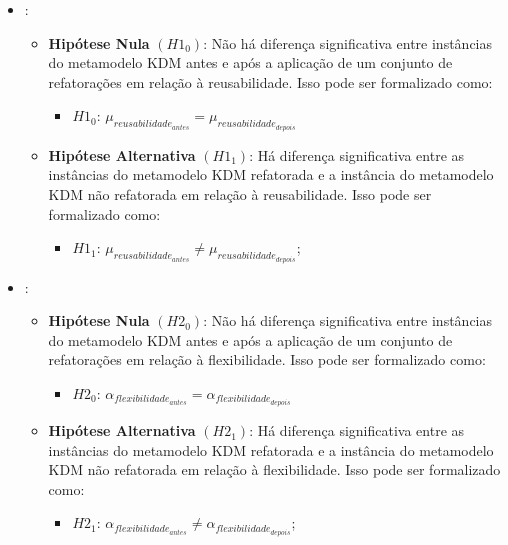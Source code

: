 \begin{itemize}

\item {}:

\begin{itemize}
\item \textbf{Hipótese Nula} \textbf{$(H1_{0})$}: Não há diferença significativa entre instâncias do metamodelo KDM antes e após a aplicação de um conjunto de refatorações em relação à reusabilidade. Isso pode ser formalizado como: 

\begin{itemize}
\item $H1_{0}$: $\mu_{reusabilidade_{antes}} = \mu_{reusabilidade_{depois}}$
\end{itemize}

\item \textbf{Hipótese Alternativa} \textbf{$(H1_{1})$}: Há diferença significativa entre as instâncias do metamodelo KDM refatorada e a instância do metamodelo KDM não refatorada em relação à reusabilidade. Isso pode ser formalizado como: 

\begin{itemize}
\item $H1_{1}$: $\mu_{reusabilidade_{antes}} \neq \mu_{reusabilidade_{depois}}$;
\end{itemize}
\end{itemize}

\item {}:

\begin{itemize}
\item \textbf{Hipótese Nula} \textbf{$(H2_{0})$}: Não há diferença significativa entre instâncias do metamodelo KDM antes e após a aplicação de um conjunto de refatorações em relação à flexibilidade. Isso pode ser formalizado como: 

\begin{itemize}
\item $H2_{0}$: $\alpha_{flexibilidade_{antes}} = \alpha_{flexibilidade_{depois}}$
\end{itemize}

\item \textbf{Hipótese Alternativa} \textbf{$(H2_{1})$}: Há diferença significativa entre as instâncias do metamodelo KDM refatorada e a instância do metamodelo KDM não refatorada em relação à flexibilidade. Isso pode ser formalizado como: 

\begin{itemize}
\item $H2_{1}$: $\alpha_{flexibilidade_{antes}} \neq \alpha_{flexibilidade_{depois}}$;
\end{itemize}
\end{itemize}


\end{itemize}

